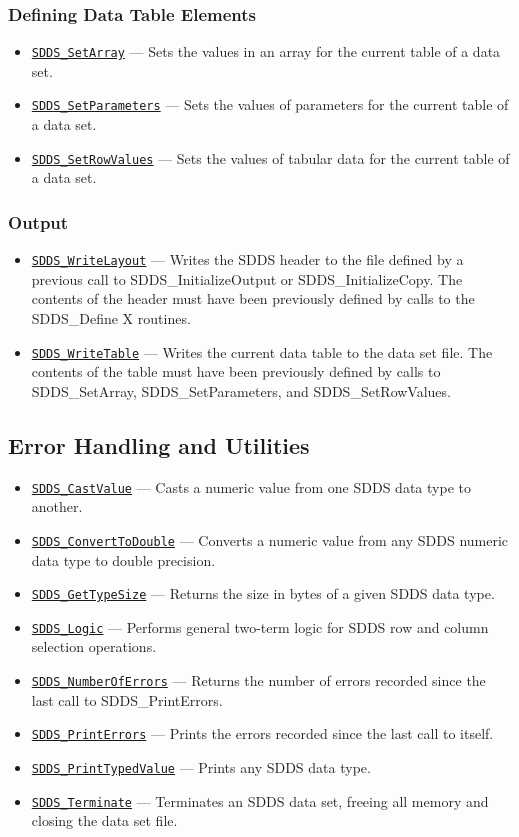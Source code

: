 \documentclass[11pt]{article}
\newcommand{\progref}[1]{\hyperref[SDDS_#1]{\tt SDDS\_#1}}
\begin{document}
\subsubsection{Defining Data Table Elements}

\begin{itemize}
\item \progref{SetArray} --- Sets the values in an array for the current table of a data set.
\item \progref{SetParameters} --- Sets the values of parameters for the current table of a data set.
\item \progref{SetRowValues} --- Sets the values of tabular data for the current table of a data set. 
\end{itemize}

\subsubsection{Output}

\begin{itemize}
\item \progref{WriteLayout} --- Writes the SDDS header to the file defined by a previous call to SDDS\_InitializeOutput or SDDS\_InitializeCopy. The contents of the header must have been previously defined by calls to the SDDS\_Define X routines.
\item \progref{WriteTable} --- Writes the current data table to the data set file. The contents of the table must have been previously defined by calls to SDDS\_SetArray, SDDS\_SetParameters, and SDDS\_SetRowValues. 
\end{itemize}

\subsection{Error Handling and Utilities}

\begin{itemize}
\item \progref{CastValue} --- Casts a numeric value from one SDDS data type to another.
\item \progref{ConvertToDouble} --- Converts a numeric value from any SDDS numeric data type to double precision.
\item \progref{GetTypeSize} --- Returns the size in bytes of a given SDDS data type.
\item \progref{Logic} --- Performs general two-term logic for SDDS row and column selection operations.
\item \progref{NumberOfErrors} --- Returns the number of errors recorded since the last call to SDDS\_PrintErrors.
\item \progref{PrintErrors} --- Prints the errors recorded since the last call to itself.
\item \progref{PrintTypedValue} --- Prints any SDDS data type.
\item \progref{Terminate} --- Terminates an SDDS data set, freeing all memory and closing the data set file. 
\end{itemize}
\end{document}
